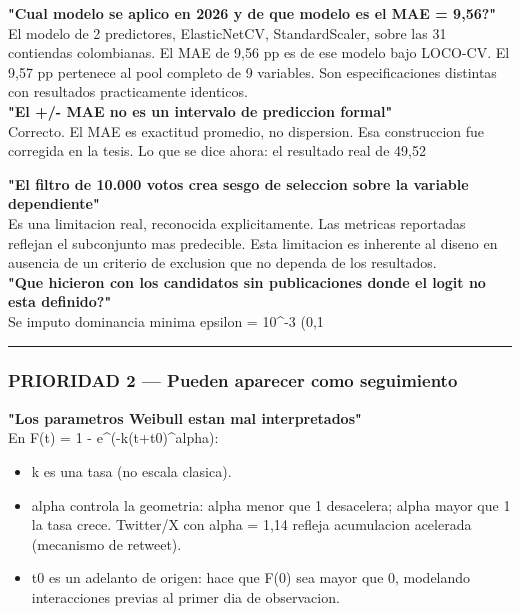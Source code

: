 \documentclass[11pt,a4paper]{article}
\begin{document}
{{{\textbf{"Cual modelo se aplico en 2026 y de que modelo es el MAE = 9,56?"}\\[2pt]
El modelo de 2 predictores, ElasticNetCV, StandardScaler, sobre las 31 contiendas colombianas. El MAE de 9,56 pp es de ese modelo bajo LOCO-CV. El 9,57 pp pertenece al pool completo de 9 variables. Son especificaciones distintas con resultados practicamente identicos.\\[2pt]

\textbf{"El +/- MAE no es un intervalo de prediccion formal"}\\[2pt]
Correcto. El MAE es exactitud promedio, no dispersion. Esa construccion fue corregida en la tesis. Lo que se dice ahora: el resultado real de 49,52%

\textbf{"El filtro de 10.000 votos crea sesgo de seleccion sobre la variable dependiente"}\\[2pt]
Es una limitacion real, reconocida explicitamente. Las metricas reportadas reflejan el subconjunto mas predecible. Esta limitacion es inherente al diseno en ausencia de un criterio de exclusion que no dependa de los resultados.\\[2pt]

\textbf{"Que hicieron con los candidatos sin publicaciones donde el logit no esta definido?"}\\[2pt]
Se imputo dominancia minima epsilon = 10^-3 (0,1%

\vspace{4pt}\noindent\rule{\linewidth}{0.4pt}\vspace{4pt}

\subsubsection{PRIORIDAD 2 — Pueden aparecer como seguimiento}

\textbf{"Los parametros Weibull estan mal interpretados"}\\[2pt]
En F(t) = 1 - e^(-k(t+t0)^alpha):\\[2pt]
\begin{itemize}[noitemsep,topsep=2pt]
\item k es una tasa (no escala clasica).
\item alpha controla la geometria: alpha menor que 1 desacelera; alpha mayor que 1 la tasa crece. Twitter/X con alpha = 1,14 refleja acumulacion acelerada (mecanismo de retweet).
\item t0 es un adelanto de origen: hace que F(0) sea mayor que 0, modelando interacciones previas al primer dia de observacion.
\end{itemize}

}}}
\end{document}
